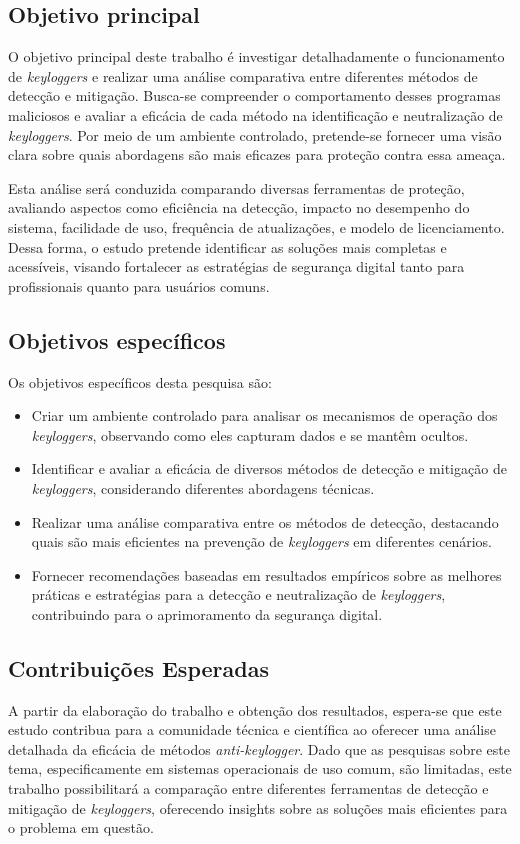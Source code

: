 \documentclass[12pt]{article}
\begin{document}
\subsection{Objetivo principal}
O objetivo principal deste trabalho é investigar detalhadamente o funcionamento de \textit{keyloggers} e realizar uma análise comparativa entre diferentes métodos de detecção e mitigação. Busca-se compreender o comportamento desses programas maliciosos e avaliar a eficácia de cada método na identificação e neutralização de \textit{keyloggers}. Por meio de um ambiente controlado, pretende-se fornecer uma visão clara sobre quais abordagens são mais eficazes para proteção contra essa ameaça.

Esta análise será conduzida comparando diversas ferramentas de proteção, avaliando aspectos como eficiência na detecção, impacto no desempenho do sistema, facilidade de uso, frequência de atualizações, e modelo de licenciamento. Dessa forma, o estudo pretende identificar as soluções mais completas e acessíveis, visando fortalecer as estratégias de segurança digital tanto para profissionais quanto para usuários comuns.

\subsection{Objetivos específicos}

Os objetivos específicos desta pesquisa são:
\begin{itemize}
    \item Criar um ambiente controlado para analisar os mecanismos de operação dos \textit{keyloggers}, observando como eles capturam dados e se mantêm ocultos.
    \item Identificar e avaliar a eficácia de diversos métodos de detecção e mitigação de \textit{keyloggers}, considerando diferentes abordagens técnicas.
    \item Realizar uma análise comparativa entre os métodos de detecção, destacando quais são mais eficientes na prevenção de \textit{keyloggers} em diferentes cenários.
    \item Fornecer recomendações baseadas em resultados empíricos sobre as melhores práticas e estratégias para a detecção e neutralização de \textit{keyloggers}, contribuindo para o aprimoramento da segurança digital.
\end{itemize}

\subsection{Contribuições Esperadas}
A partir da elaboração do trabalho e obtenção dos resultados, espera-se que este estudo contribua para a comunidade técnica e científica ao oferecer uma análise detalhada da eficácia de métodos \textit{anti-keylogger}. Dado que as pesquisas sobre este tema, especificamente em sistemas operacionais de uso comum, são limitadas, este trabalho possibilitará a comparação entre diferentes ferramentas de detecção e mitigação de \textit{keyloggers}, oferecendo insights sobre as soluções mais eficientes para o problema em questão.
\end{document}
